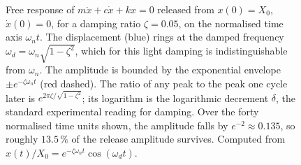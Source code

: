 \begin{figure}[htbp]
\centering
{}
\caption[Free decay of an underdamped oscillator]{Free response of
$m\ddot{x}+c\dot{x}+kx=0$ released from $x(0)=X_0$, $\dot{x}(0)=0$,
for a damping ratio $\zeta=0.05$, on the normalised time axis
$\omega_n t$. The displacement (blue) rings at the damped frequency
$\omega_d=\omega_n\sqrt{1-\zeta^2}$, which for this light damping is
indistinguishable from $\omega_n$. The amplitude is bounded by the
exponential envelope $\pm e^{-\zeta\omega_n t}$ (red dashed). The
ratio of any peak to the peak one cycle later is
$e^{2\pi\zeta/\sqrt{1-\zeta^2}}$; its logarithm is the logarithmic
decrement $\delta$, the standard experimental reading for damping.
Over the forty normalised time units shown, the amplitude falls by
$e^{-2}\approx 0.135$, so roughly $13.5\,\%$ of the release amplitude
survives. Computed from $x(t)/X_0=e^{-\zeta\omega_n t}\cos(\omega_d t)$.}
\label{fig:vol03ch06:free-decay}
\end{figure}
